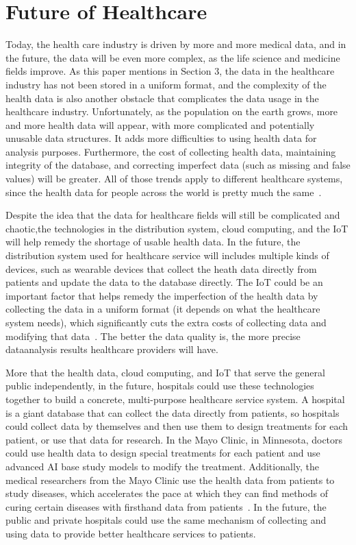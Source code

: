 \section{Future of Healthcare}
Today, the health care industry is driven by more and more 
medical data, and in
the future, the data will be even more complex, as the 
life science and medicine fields improve. As this paper mentions in 
Section 3, the data in the healthcare industry has not been stored 
in a uniform format, and the 
complexity of the health data is also another obstacle that 
complicates the data usage in the 
healthcare industry. Unfortunately, as the population on the 
earth grows, more and more health data will appear, 
with more complicated 
and potentially unusable data structures. It adds
more difficulties to using health data for analysis purposes. 
Furthermore, the cost
of collecting health data, maintaining integrity of the database, 
and correcting imperfect
data (such as missing and false values) will be greater. 
All of those trends apply to 
different healthcare systems, since the health data for people 
across the world is pretty much 
the same~\cite{f3,f4}.

Despite the idea that the data for healthcare fields will still be 
complicated and chaotic,the technologies in the distribution 
system, cloud computing, and the IoT will 
help remedy the shortage of usable health data. In the future, 
the distribution system used for healthcare service will includes 
multiple kinds of devices, such as wearable devices that collect 
the heath data directly from 
patients and update the data to the database directly. 
The IoT could be an 
important factor that helps remedy the 
imperfection of the health data by 
collecting the data in a uniform format 
(it depends on what the healthcare 
system needs), which significantly cuts 
the extra costs of collecting data 
and modifying that data~\cite{f2,f3}. 
The better the data quality is, 
the more precise dataanalysis results 
healthcare providers will have.

More that the health data, cloud computing, 
and IoT that serve the 
general public independently, in the future, 
hospitals could use 
these technologies together to build a concrete, 
multi-purpose 
healthcare service system. A hospital is a 
giant database that can 
collect the data directly from patients, so 
hospitals could collect 
data by themselves and then use them to 
design treatments for 
each patient, or use that data for research.
In the Mayo Clinic, in Minnesota, doctors could use 
health data to design special 
treatments for each patient and use 
advanced AI base 
study models to modify the treatment.
Additionally, the medical researchers 
from the Mayo Clinic use the health data 
from patients to study diseases, which 
accelerates the 
pace at which they can find methods of curing
certain diseases with firsthand data from 
patients~\cite{mayo}. 
In the future, the 
public and private hospitals could use 
the same mechanism of 
collecting and using data to provide better 
healthcare services to patients. 

